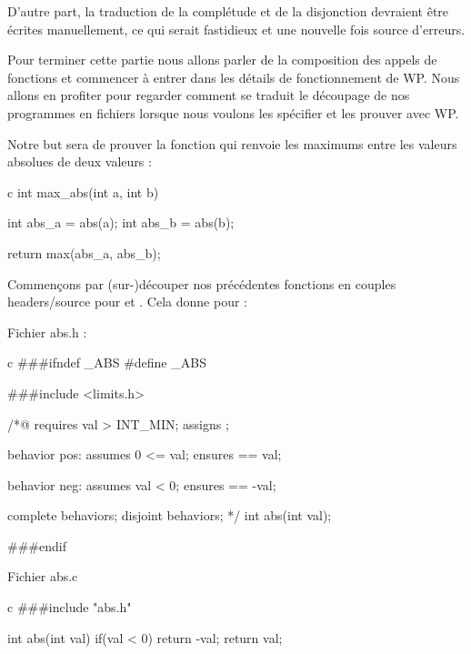 \documentclass[middle]{zmdocument}
\begin{document}
D'autre part, la traduction de la complétude et de la disjonction devraient 
être écrites manuellement, ce qui serait fastidieux et une nouvelle fois source
d'erreurs.





Pour terminer cette partie nous allons parler de la composition des appels de
fonctions et commencer à entrer dans les détails de fonctionnement de WP. Nous
allons en profiter pour regarder comment se traduit le découpage de nos 
programmes en fichiers lorsque nous voulons les spécifier et les prouver avec WP.



Notre but sera de prouver la fonction  qui renvoie les maximums 
entre les valeurs absolues de deux valeurs :



\begin{CodeBlock}{c}
int max_abs(int a, int b){
  int abs_a = abs(a);
  int abs_b = abs(b);

  return max(abs_a, abs_b);
}
\end{CodeBlock}



Commençons par (sur-)découper nos précédentes fonctions en couples 
headers/source pour  et . Cela donne pour  :



Fichier abs.h :



\begin{CodeBlock}{c}
###ifndef _ABS
#define _ABS

###include <limits.h>

/*@
  requires val > INT_MIN;
  assigns  \nothing;

  behavior pos:
    assumes 0 <= val;
    ensures \result == val;
  
  behavior neg:
    assumes val < 0;
    ensures \result == -val;
 
  complete behaviors;
  disjoint behaviors;
*/
int abs(int val);

###endif
\end{CodeBlock}



Fichier abs.c



\begin{CodeBlock}{c}
###include "abs.h"

int abs(int val){
  if(val < 0) return -val;
  return val;
}
\end{CodeBlock}
\end{document}

